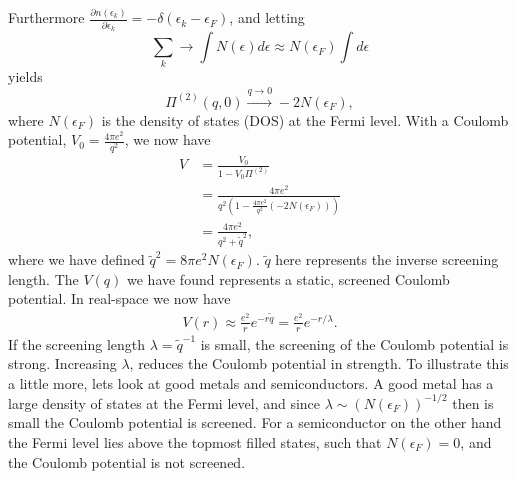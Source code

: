 Furthermore $\frac{\partial n(\epsilon_k)}{\partial \epsilon_k}=-\delta(\epsilon_k-\epsilon_F)$, and letting
\begin{equation}
\sum_k \rightarrow\int N(\epsilon)d\epsilon\approx N(\epsilon_F)\int d\epsilon
\end{equation}
yields
\begin{equation}
\Pi^{(2)}(q,0)\stackrel{q\rightarrow 0}{\rightarrow}-2N(\epsilon_F),
\end{equation}
where $N(\epsilon_F)$ is the density of states (DOS) at the Fermi level. With a Coulomb potential, $V_0=\frac{4\pi e^2}{q^2}$, we now have
\begin{align*}
V&=\frac{V_0}{1-V_0\Pi^{(2)}}\\
&=\frac{4\pi e^2}{q^2(1-\frac{4\pi e^2}{q^2}(-2N(\epsilon_F)))}\\
&=\frac{4\pi e^2}{q^2+\widetilde{q}^2},
\end{align*}
where we have defined $\widetilde{q}^2=8\pi e^2N(\epsilon_F)$. $\widetilde{q}$ here represents the inverse screening length. The $V(q)$ we have found represents a static, screened Coulomb potential. In real-space we now have
\begin{align*}
V(r)\approx \frac{e^2}{r}e^{-r\widetilde{q}}=\frac{e^2}{r}e^{-r/\lambda}.
\end{align*}
If the screening length $\lambda=\widetilde{q}^{-1}$ is small, the screening of the Coulomb potential is strong. Increasing $\lambda$, reduces the Coulomb potential in strength. To illustrate this a little more, lets look at good metals and semiconductors. A good metal has a large density of states at the Fermi level, and since $\lambda \sim (N(\epsilon_F))^{-1/2}$ then is small the Coulomb potential is screened. For a semiconductor on the other hand the Fermi level lies above the topmost filled states, such that $N(\epsilon_F)=0$, and the Coulomb potential is not screened.

